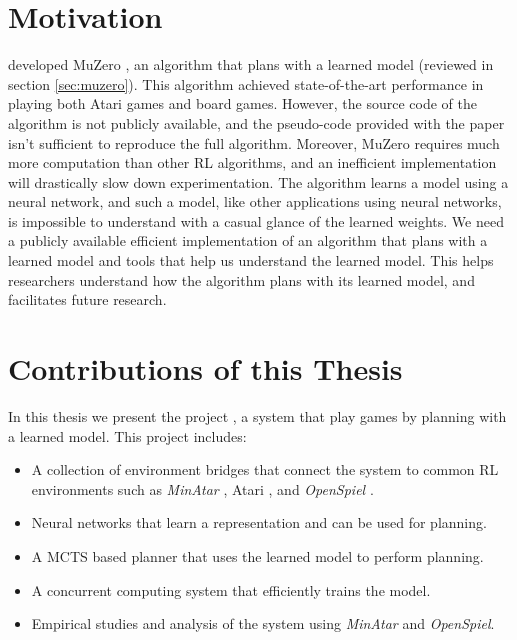\section{Motivation}
\citeauthor{MasteringAtariGo_Schrittwieser.Antonoglou.ea_2020} developed MuZero \cite{MasteringAtariGo_Schrittwieser.Antonoglou.ea_2020}, an algorithm that plans with a learned model (reviewed in section \ref{sec:muzero}).
This algorithm achieved state-of-the-art performance in playing both Atari games and board games.
However, the source code of the algorithm is not publicly available, and the pseudo-code provided with the paper isn't sufficient to reproduce the full algorithm.
Moreover, MuZero requires much more computation than other RL algorithms, and an inefficient implementation will drastically slow down experimentation.
The algorithm learns a model using a neural network, and such a model, like other applications using neural networks, is impossible to understand with a casual glance of the learned weights.
We need a publicly available efficient implementation of an algorithm that plans with a learned model and tools that help us understand the learned model.
This helps researchers understand how the algorithm plans with its learned model, and facilitates future research.

\section{Contributions of this Thesis}
In this thesis we present the project \textbf{\moozi}, a system that play games by planning with a learned model.
This project includes:
\begin{itemize}
    \item A collection of environment bridges that connect the system to common RL environments such as \textit{MinAtar} \cite{MasteringAtariGames_Ye.Liu.ea_2021}, Atari \cite{ArcadeLearningEnvironment_Bellemare.Naddaf.ea_2013}, and \textit{OpenSpiel} \cite{OpenSpielFrameworkReinforcement_Lanctot.Lockhart.ea_2020}.
    \item Neural networks that learn a representation and can be used for planning.
    \item A MCTS based planner that uses the learned model to perform planning.
    \item A concurrent computing system that efficiently trains the model.
    \item Empirical studies and analysis of the system using \textit{MinAtar} and \textit{OpenSpiel}.
\end{itemize}